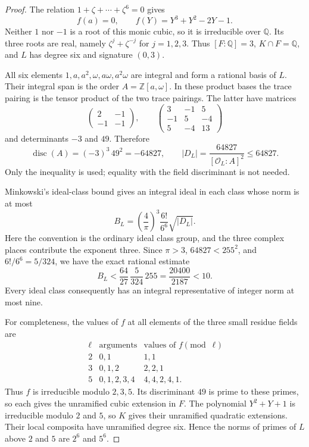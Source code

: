 \begin{proof}
The relation $1+\zeta+\cdots+\zeta^6=0$ gives
\[
 f(a)=0,\qquad f(Y)=Y^3+Y^2-2Y-1.
 \tag{G185.2}
\]
Neither $1$ nor $-1$ is a root of this monic cubic, so it is
irreducible over $\mathbb Q$.  Its three roots are real, namely
$\zeta^j+\zeta^{-j}$ for $j=1,2,3$.
Thus $[F:\mathbb Q]=3$, $K\cap F=\mathbb Q$, and $L$ has
degree six and signature $(0,3)$.

All six elements $1,a,a^2,\omega,a\omega,a^2\omega$ are integral
and form a rational basis of $L$.  Their integral span is the order
$A=\mathbb Z[a,\omega]$.  In these product bases the trace pairing
is the tensor product of the two trace pairings.  The latter have
matrices
\[
 \begin{pmatrix}2&-1\\-1&-1\end{pmatrix},\qquad
 \begin{pmatrix}3&-1&5\\-1&5&-4\\5&-4&13\end{pmatrix}
 \tag{G185.3}
\]
and determinants $-3$ and $49$.  Therefore
\[
 \operatorname{disc}(A)=(-3)^3\,49^2=-64827,
 \qquad
 |D_L|=\frac{64827}{[\mathcal O_L:A]^2}\leq64827.
 \tag{G185.4}
\]
Only the inequality is used; equality with the field discriminant
is not needed.

Minkowski's ideal-class bound gives an integral ideal in each class
whose norm is at most
\[
 B_L=\left(\frac4\pi\right)^3\frac{6!}{6^6}\sqrt{|D_L|}.
 \tag{G185.5}
\]
Here the convention is the ordinary ideal class group, and the
three complex places contribute the exponent three.  Since
$\pi>3$, $64827<255^2$, and $6!/6^6=5/324$, we have the exact
rational estimate
\[
 B_L<\frac{64}{27}\,\frac5{324}\,255
       =\frac{20400}{2187}<10.
 \tag{G185.6}
\]
Every ideal class consequently has an integral representative of
integer norm at most nine.

For completeness, the values of $f$ at all elements of the three
small residue fields are
\[
\begin{array}{c|c|c}
\ell&\text{arguments}&\text{values of }f\pmod\ell\\ \hline
2&0,1&1,1\\
3&0,1,2&2,2,1\\
5&0,1,2,3,4&4,4,2,4,1.
\end{array}
 \tag{G185.7}
\]
Thus $f$ is irreducible modulo $2,3,5$.  Its discriminant $49$
is prime to these primes, so each gives the unramified cubic
extension in $F$.  The polynomial $Y^2+Y+1$ is irreducible modulo
$2$ and $5$, so $K$ gives their unramified quadratic extensions.
Their local composita have unramified degree six.  Hence the norms
of primes of $L$ above $2$ and $5$ are $2^6$ and $5^6$.


\end{proof}
